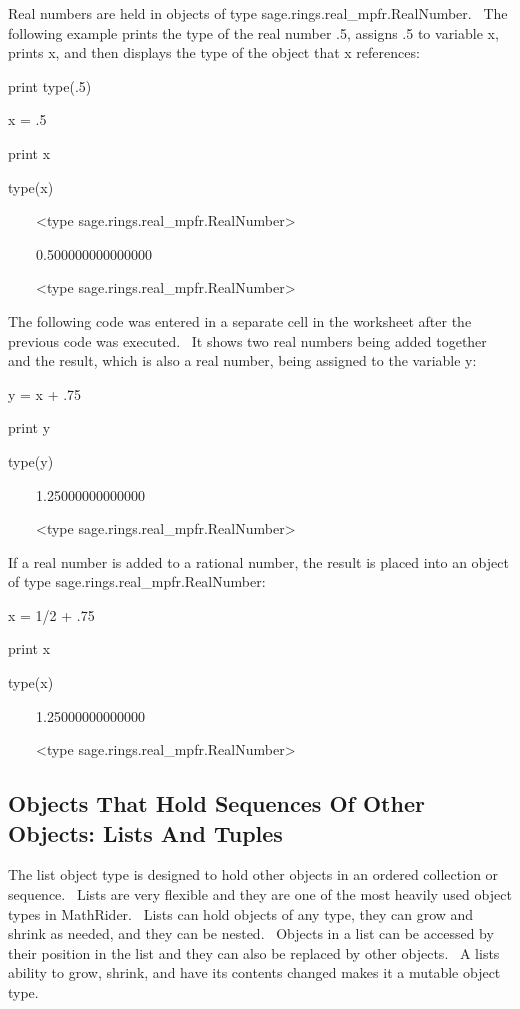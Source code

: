 \documentclass[12pt,twoside]{book}
\begin{document}
Real numbers are held in objects of type sage.rings.real\_mpfr.RealNumber. \ The following example prints the type of the real number .5, assigns .5 to variable x, prints x, and then displays the type of the object that x references:

print type(.5)

x = .5

print x

type(x)

{\textbar}

\ \ \ \ {\textless}type {\textquotesingle}sage.rings.real\_mpfr.RealNumber{\textquotesingle}{\textgreater}

\ \ \ \ 0.500000000000000

\ \ \ \ {\textless}type {\textquotesingle}sage.rings.real\_mpfr.RealNumber{\textquotesingle}{\textgreater}

The following code was entered in a separate cell in the worksheet after the previous code was executed. \ It shows two real numbers being added together and the result, which is also a real number, being assigned to the variable y:

y = x + .75

print y

type(y)

{\textbar}

\ \ \ \ 1.25000000000000

\ \ \ \ {\textless}type {\textquotesingle}sage.rings.real\_mpfr.RealNumber{\textquotesingle}{\textgreater}

If a real number is added to a rational number, the result is placed into an object of type sage.rings.real\_mpfr.RealNumber: 

\bigskip

x = 1/2 + .75

print x

type(x)

{\textbar}

\ \ \ \ 1.25000000000000

\ \ \ \ {\textless}type {\textquotesingle}sage.rings.real\_mpfr.RealNumber{\textquotesingle}{\textgreater}

\subsection[Objects That Hold Sequences Of Other Objects: Lists And Tuples]{ Objects That Hold Sequences Of Other Objects: Lists And Tuples}

The list object type is designed to hold other objects in an ordered collection or sequence. \ Lists are very flexible and they are one of the most heavily used object types in MathRider. \ Lists can hold objects of any type, they can grow and shrink as needed, and they can be nested. \ Objects in a list can be accessed by their position in the list and they can also be replaced by other objects. \ A list{\textquotesingle}s ability to grow, shrink, and have its contents changed makes it a mutable object type.
\end{document}
